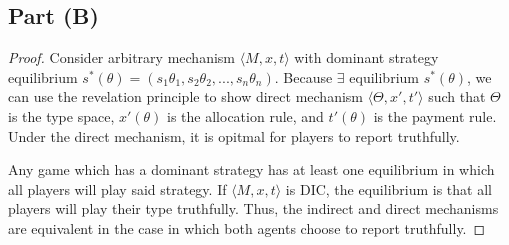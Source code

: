 \documentclass[10pt,a4paper]{article}
\begin{document}
  \subsection*{Part (B)}
    \begin{proof}
      Consider arbitrary mechanism $\langle M, x, t \rangle$ with dominant strategy equilibrium $s^*(\theta) = (s_1\theta_1, s_2\theta_2, ..., s_n\theta_n)$. Because $\exists$ equilibrium $s^*(\theta)$, we can use the revelation principle to show direct mechanism $\langle \Theta, x', t' \rangle$ such that $\Theta$ is the type space, $x'(\theta)$ is the allocation rule, and $t'(\theta)$ is the payment rule. Under the direct mechanism, it is opitmal for players to report truthfully. 

      Any game which has a dominant strategy has at least one equilibrium in which all players will play said strategy. If $\langle M, x, t \rangle$ is DIC, the equilibrium is that all players will play their type truthfully. Thus, the indirect and direct mechanisms are equivalent in the case in which both agents choose to report truthfully.
    \end{proof}
\end{document}
